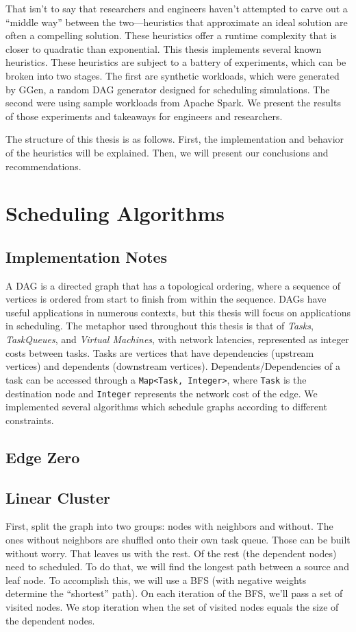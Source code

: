 \documentclass[11pt, oneside]{article}   	%
\begin{document}
That isn't to say that researchers and engineers haven't attempted to carve out a ``middle way'' between the two---heuristics that approximate an ideal solution are often a compelling solution. These heuristics offer a runtime complexity that is closer to quadratic than exponential. This thesis implements several known heuristics. These heuristics are subject to a battery of experiments, which can be broken into two stages. The first are synthetic workloads, which were generated by GGen, a random DAG generator designed for scheduling simulations. The second were using sample workloads from Apache Spark. We present the results of those experiments and takeaways for engineers and researchers.

The structure of this thesis is as follows. First, the implementation and behavior of the heuristics will be explained. Then, we will present our conclusions and recommendations.

\section{Scheduling Algorithms}

\subsection*{Implementation Notes}

A DAG is a directed graph that has a topological ordering, where a sequence of vertices is ordered from start to finish from within the sequence. DAGs have useful applications in numerous contexts, but this thesis will focus on applications in scheduling. The metaphor used throughout this thesis is that of \emph{Tasks}, \emph{TaskQueues}, and \emph{Virtual Machines}, with network latencies, represented as integer costs between tasks. Tasks are vertices that have dependencies (upstream vertices) and dependents (downstream vertices). Dependents/Dependencies of a task can be accessed through a \texttt{Map<Task, Integer>}, where \texttt{Task} is the destination node and \texttt{Integer} represents the network cost of the edge. We implemented several algorithms which schedule graphs according to different constraints.

\subsection{Edge Zero}
\subsection{Linear Cluster}
First, split the graph into two groups: nodes with neighbors and without. The ones without neighbors are shuffled onto their own task queue. Those can be built without worry. That leaves us with the rest. Of the rest (the dependent nodes) need to scheduled. To do that, we will find the longest path between a source and leaf node. To accomplish this, we will use a BFS (with negative weights determine the ``shortest'' path). On each iteration of the BFS, we'll pass a set of visited nodes. We stop iteration when the set of visited nodes equals the size of the dependent nodes.
\end{document}
